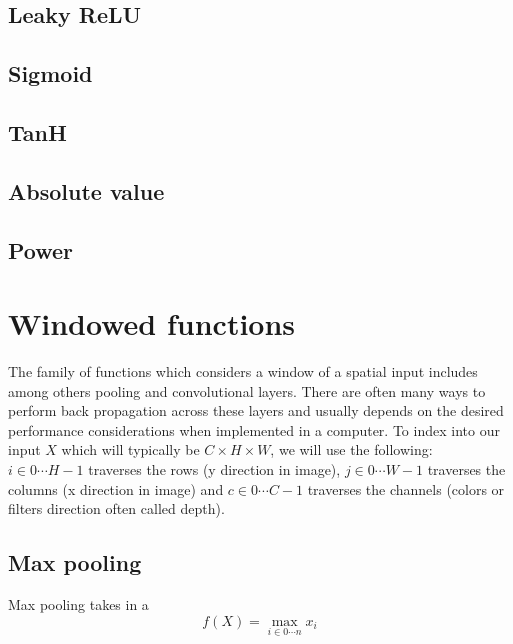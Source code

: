 \documentclass[a4paper]{article}
\begin{document}
\subsection{Leaky ReLU}
\subsection{Sigmoid}
\subsection{TanH}
\subsection{Absolute value}
\subsection{Power}


\newpage
\section{Windowed functions}
The family of functions which considers a window of a spatial input includes among others pooling and convolutional layers. There are often many ways to perform back propagation across these layers and usually depends on the desired performance considerations when implemented in a computer.  To index into our input $X$ which will typically be $C \times H \times W$, we will use the following: $i \in 0 \cdots H-1$ traverses the rows (y direction in image), $j \in 0 \cdots W-1$ traverses the columns (x direction in image) and $c \in 0 \cdots C-1$ traverses the channels (colors or filters direction often called depth).

\subsection{Max pooling}
Max pooling takes in a 
\begin{equation}
f(X)=\max\limits_{i \in 0 \cdots n} x_i
\end{equation}
\end{document}

